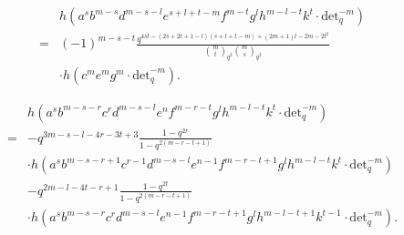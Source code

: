 \documentclass[10pt,a4paper]{amsart}
\begin{document}
\begin{equation}\label{eq:4.69}
    \begin{split}
        &h\left(a^{s}b^{m-s}d^{m-s-l}e^{s+l+t-m}f^{m-t}g^{l}h^{m-l-t}k^{t}\cdot\text{det}_q^{-m}\right)\\
        =&(-1)^{m-s-t}
        \frac{q^{4st-(2s+2t+1-l)(s+l+t-m)+(2m+1)l-2m-2l^2}}{{m\choose t}_{q^2}{m\choose s}_{q^2}}\\
        &\cdot h\left(c^me^mg^m\cdot\text{det}_q^{-m}\right).
    \end{split}
\end{equation}

\begin{equation}\label{eq:4.72}
    \begin{split}
        &h\left(a^sb^{m-s-r}c^rd^{m-s-l}e^{n}f^{m-r-t}g^lh^{m-l-t}k^t\cdot\text{det}_q^{-m}\right)\\
        =&-q^{3m-s-l-4r-3t+3}\frac{1-q^{2r}}{1-q^{2(m-r-t+1)}}\\
        &\cdot h\left(a^sb^{m-s-r+1}c^{r-1}d^{m-s-l}e^{n-1}f^{m-r-t+1}g^lh^{m-l-t}k^t\cdot\text{det}_q^{-m}\right)\\
        &-q^{2m-l-4t-r+1}\frac{1-q^{2t}}{1-q^{2(m-r-t+1)}}\\
        &\cdot h\left(a^sb^{m-s-r}c^rd^{m-s-l}e^{n-1}f^{m-r-t+1}g^lh^{m-l-t+1}k^{t-1}\cdot\text{det}_q^{-m}\right).
    \end{split}
\end{equation}
\end{document}
